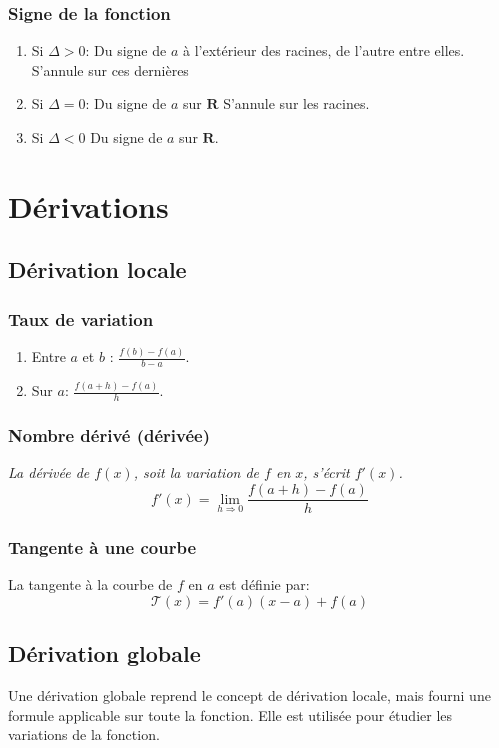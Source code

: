 \documentclass{article}
\begin{document}
\subsubsection{Signe de la fonction}
    \begin{enumerate}
        \item Si $\Delta > 0$: Du signe de $a$ à l'extérieur des racines, de l'autre entre elles. S'annule sur ces dernières
        \item Si $\Delta = 0$: Du signe de $a$ sur $\mathbf{R}$ S'annule sur les racines.
        \item Si $\Delta < 0$ Du signe de $a$ sur $\mathbf{R}$.
    \end{enumerate}



\section{Dérivations}


\subsection{Dérivation locale}

\subsubsection{Taux de variation}
    \begin{enumerate}
        \item Entre $a$ et $b$ : $\frac{f(b) - f(a)}{b - a}$.
        \item Sur $a$: $\frac{f(a + h) - f(a)}{h}$.
    \end{enumerate}

\subsubsection{Nombre dérivé (dérivée)}
    \textit{La dérivée de $f(x)$, soit la variation de $f$ en $x$, s'écrit $f'(x)$.}
    $$f'(x) = \lim \limits_{h \Rightarrow 0} \frac{f(a + h) - f(a)}{h}$$

\subsubsection{Tangente à une courbe}
    La tangente à la courbe de $f$ en $a$ est définie par: $$\mathcal{T}(x) = f'(a)(x-a) + f(a)$$


\subsection{Dérivation globale}
    Une dérivation globale reprend le concept de dérivation locale, mais fourni une formule applicable sur toute la fonction. Elle est utilisée pour étudier les variations de la fonction.
\end{document}
